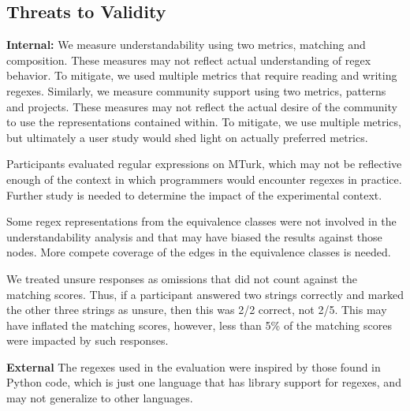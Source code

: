 \subsection{Threats to Validity}

\textbf{Internal:}
We measure understandability  using two metrics, matching and composition. These measures may not reflect actual understanding of regex behavior. To mitigate, we used multiple metrics that require reading and writing regexes. %
Similarly, we measure community support using two metrics, patterns and projects. These measures may not reflect the actual  desire of the community to use the representations  contained within. To mitigate, we use multiple metrics, but ultimately a user study would shed light on actually preferred metrics. 

Participants evaluated regular expressions  on MTurk, which may not be reflective enough of the context in which programmers would encounter regexes in practice. Further study is needed to determine the impact of the experimental context. 

Some regex representations from the equivalence classes were not involved in the understandability analysis and that may have biased the results against those nodes. 
More compete coverage of the edges in the equivalence classes is needed.

We treated unsure responses as omissions that  did not count  against the matching scores. Thus, if a participant answered two strings correctly and marked the other three strings as unsure, then this was 2/2 correct, not 2/5. This may have inflated the matching scores, however, less than 5\% of the matching scores were impacted by such responses.



%

\textbf{External}
The regexes  used in the evaluation were inspired by those found in Python code, which is just one language that has library support for regexes, and may not generalize to other languages.%

